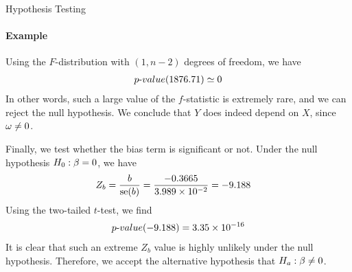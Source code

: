 \begin{frame}{Hypothesis Testing}
\framesubtitle{Example}
%
    Using the $F$-distribution with $(1,n-2)$ degrees of freedom, we
    have
    \begin{align*}
        {p\text{-}value}(1876.71) \simeq 0
    \end{align*}
    In other words, such a large value of the $f$-statistic is extremely
    rare, and we can reject the null hypothesis. We conclude that $Y$
    does indeed depend on $X$, since $\omega\ne 0$.

    Finally, we test whether the bias term is significant or not. Under
    the null hypothesis $H_0: \beta=0$, we have
    \begin{align*}
        Z_{b} & =  \frac{b}{\operatorname{se}(b)} =
    \frac{-0.3665}{3.989 \times 10^{-2}} = -9.188 
    \end{align*}
    Using the two-tailed $t$-test, we find
    \begin{align*}
        {p\text{-}value}(-9.188)  = 3.35 \times 10^{-16}
    \end{align*}
    It is clear that such an extreme $Z_{b}$ value is highly unlikely
    under the null hypothesis. Therefore, we accept the alternative
    hypothesis that $H_a: \beta\ne 0$.
\end{frame}
%
%
%
%
